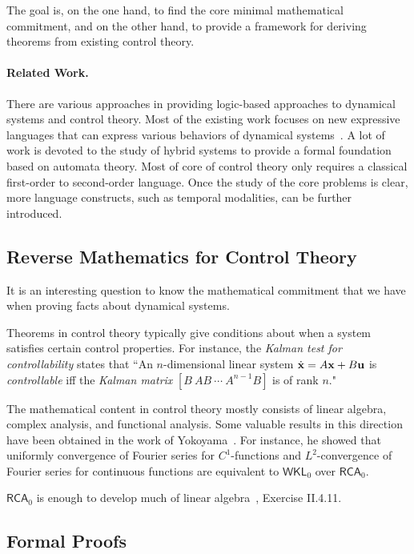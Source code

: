\documentclass[10pt]{article}
\theoremstyle{definition}
\begin{document}
The goal is, on the one hand, to find the core minimal mathematical commitment, and on the other hand, to provide a framework for deriving theorems from existing control theory. 


\paragraph{Related Work. } There are various approaches in providing logic-based approaches to dynamical systems and control theory. Most of the existing work focuses on new expressive languages that can express various behaviors of dynamical systems~\cite{}. A lot of work is devoted to the study of hybrid systems to provide a formal foundation based on automata theory. Most of core of control theory only requires a classical first-order to second-order language. Once the study of the core problems is clear, more language constructs, such as temporal modalities, can be further introduced. 

\subsection{Reverse Mathematics for Control Theory} 

It is an interesting question to know the mathematical commitment that we have when proving facts about dynamical systems. 

Theorems in control theory typically give conditions about when a system satisfies certain control properties. For instance, the {\em Kalman test for controllability} states that ``An $n$-dimensional linear system $\dot {\bf x} = A{\bf x}+B{\bf u}$ is {\em controllable} iff the {\em Kalman matrix}
$[B\ AB\ \cdots\ A^{n-1}B]$ is of rank $n$." 

The mathematical content in control theory mostly consists of linear algebra, complex analysis, and functional analysis. Some valuable results in this direction have been obtained in the work of Yokoyama~\cite{yoko}. For instance, he showed that uniformly convergence of Fourier series for $C^1$-functions and $L^2$-convergence of Fourier series for continuous functions are equivalent to $\mathsf{WKL}_0$ over $\mathsf{RCA}_0$. 

$\mathsf{RCA}_0$ is enough to develop much of linear algebra~\cite{}, Exercise II.4.11. 

\subsection{Formal Proofs}
\end{document}
